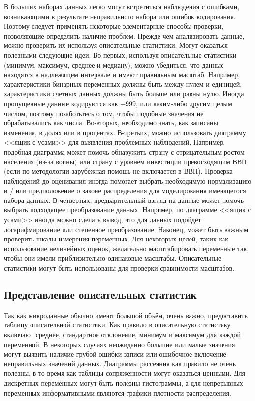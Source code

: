 В больших наборах данных легко могут встретиться наблюдения с ошибками, возникающими в результате  неправильного набора или ошибок кодирования. Поэтому следует применять некоторые элементарные способы проверки, позволяющие определить наличие проблем. Прежде чем анализировать данные, можно проверить их используя описательные статистики. Могут оказаться полезными следующие идеи. 
Во-первых, используя описательные статистики (минимум, максимум, среднее и медиану), можно убедиться, что данные находятся в надлежащем интервале и имеют правильным масштаб. Например, характеристики бинарных переменных должны быть между нулем и единицей, характеристики счетных данных должны быть больше или равны нулю. Иногда пропущенные данные кодируются как $-999$, или каким-либо другим целым числом, поэтому позаботьтесь о том, чтобы подобные значения не обрабатывались как числа. 
Во-вторых, необходимо знать, как записаны изменения, в долях или в процентах. 
В-третьих, можно использовать диаграмму <<ящик с усами>> для выявления проблемных наблюдений.  
Например, подобная диаграмма может помочь обнаружить страну с отрицательным ростом населения (из-за войны) или страну с уровнем инвестиций превосходящим ВВП (если по методологии зарубежная помощь не включается в  ВВП). 
Проверка наблюдений до оценивания иногда помогает выбрать необходимую нормализацию и / или предположение о законе распределения для моделирования имеющегося набора данных. 
В-четвертых, %
предварительный взгляд на данные может помочь выбрать подходящее преобразование данных. Например, по диаграмме <<ящик с усами>> иногда можно сделать вывод, что для данных подойдет логарифмирование или степенное преобразование.
Наконец, может быть важным проверить шкалы измерения переменных. Для некоторых целей, таких как использование нелинейных оценок, желательно масштабировать переменные так, чтобы они имели приблизительно одинаковые масштабы. Описательные статистики могут быть использованы для проверки сравнимости масштабов.


\subsection{Представление описательных статистик}

Так как микроданные обычно имеют большой объём, очень важно, предоставить таблицу описательной статистики. Как правило в описательную статистику включают среднее, стандартное отклонение, минимум и максимум для каждой переменной. В некоторых случаях неожиданно большие или малые значения могут выявить наличие грубой ошибки записи или ошибочное включение неправильных значений  данных. Диаграммы рассеяния как правило не очень полезны, в то время как таблицы сопряженности могут оказаться ценными. Для дискретных переменных могут быть полезны гистограммы, а для непрерывных переменных информативными являются графики плотности распределения.

